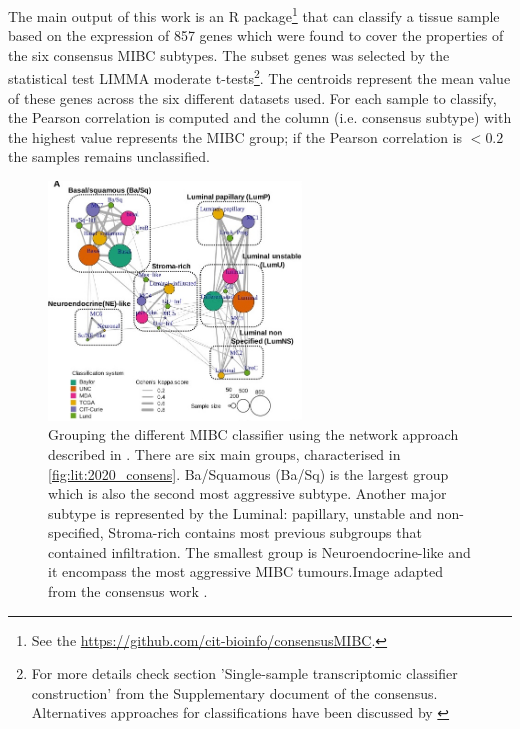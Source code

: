 The main output of this work is an R package\footnote{See the \url{https://github.com/cit-bioinfo/consensusMIBC}.} that can classify a tissue sample based on the expression of 857 genes which were found to cover the properties of the six consensus MIBC subtypes. The subset genes was selected by the statistical test LIMMA moderate t-tests\footnote{For more details check section 'Single-sample transcriptomic classifier construction' from the Supplementary document of the consensus. Alternatives approaches for classifications have been discussed by \citet{Eriksson2022-vw}}. The centroids represent the mean value of these genes across the six different datasets used. For each sample to classify, the Pearson correlation is computed and the column (i.e. consensus subtype) with the highest value represents the MIBC group; if the Pearson correlation is $<0.2$ the samples remains unclassified. 

\begin{figure}[!htb]    
    \centering
\includegraphics[width=0.6\textwidth,height=0.6\textheight,keepaspectratio]{Sections/Lit_review/Resources/consensus_network_classifier.jpg}
    \caption{Grouping the different MIBC classifier using the network approach described in \cite{Guinney2015-fy}. There are six main groups, characterised in \cref{fig:lit:2020_consens}. Ba/Squamous (Ba/Sq) is the largest group which is also the second most aggressive subtype. Another major subtype is represented by the Luminal: papillary, unstable and non-specified, Stroma-rich contains most previous subgroups that contained infiltration. The smallest group is Neuroendocrine-like and it encompass the most aggressive MIBC tumours.Image adapted from the consensus work \citet{Kamoun2020-tj}.}
    \label{fig:lit:consensus_network}
\end{figure}


